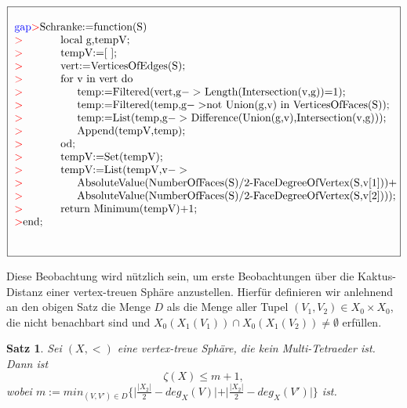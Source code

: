 \documentclass[12pt,titlepage,twoside,cleardoublepage]{article}
\theoremstyle{nummermitklammern}
\newtheorem{satz}[temp]{Satz}
\newtheorem{satz}[zahl]{Satz}
\numberwithin{equation}{section}
\begin{document}
\begin{center}
$\fbox{
\parbox{13.4cm}{
\begin{tabbing}
\textcolor{blue}{gap}\textcolor{red}{$>$}Schr\=anke:=function(S)\\
\textcolor{red}{$>$}\> local g,tempV;\\
\textcolor{red}{$>$}\> tempV:=[ ];\\
\textcolor{red}{$>$}\> vert:=VerticesOfEdges(S);\\
\textcolor{red}{$>$}\> for \=v in vert do\\
\textcolor{red}{$>$}\>\> temp:=Filtered(vert,g$->$ Length(Intersection(v,g))=1);\\
\textcolor{red}{$>$}\>\> temp:=Filtered(temp,g$->$not Union(g,v) in VerticesOfFaces(S));\\
\textcolor{red}{$>$}\>\> temp:=List(temp,g$->$ Difference(Union(g,v),Intersection(v,g)));\\
\textcolor{red}{$>$}\>\> Append(tempV,temp);\\
\textcolor{red}{$>$}\> od;\\
\textcolor{red}{$>$}\> tempV:=Set(tempV);\\
\textcolor{red}{$>$}\> tempV:=List(tempV,v$->$\\ \textcolor{red}{$>$}\>\>AbsoluteValue(NumberOfFaces(S)/2-FaceDegreeOfVertex(S,v[1]))+\\
\textcolor{red}{$>$}\>\> AbsoluteValue(NumberOfFaces(S)/2-FaceDegreeOfVertex(S,v[2])));\\
\textcolor{red}{$>$}\> return Minimum(tempV)+1;\\
\textcolor{red}{$>$}end;\\
\end{tabbing}
}}$
\end{center}
Diese Beobachtung wird nützlich sein, um erste Beobachtungen über die Kaktus-Distanz einer vertex-treuen Sphäre anzustellen. Hierfür definieren wir anlehnend an den obigen Satz die Menge $D$ als die Menge aller Tupel $(V_1,V_2)\in X_0 \times X_0$, die nicht benachbart sind und $ X_0(X_1(V_1))\cap X_0(X_1(V_2))\neq \emptyset$ erfüllen.
\begin{satz}
Sei $(X,<)$ eine vertex-treue Sphäre, die kein Multi-Tetraeder ist. Dann ist 
\[
\zeta(X)\leq m+1,
\] wobei $m:=min_{(V,V')\in D}\{\vert\frac{\vert X_2 \vert}{2}-deg_X(V)\vert +\vert \frac{\vert X_2 \vert}{2}-deg_X(V')\vert\}$
 ist.
\end{satz}
\end{document}
